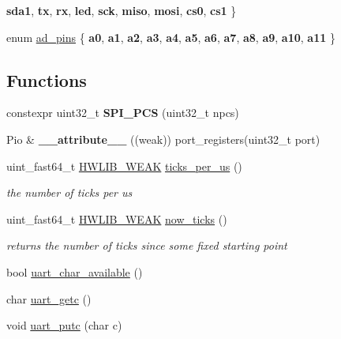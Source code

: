 \begin{DoxyCompactItemize}
{\bfseries sda1}, 
{\bfseries tx}, 
{\bfseries rx}, 
\newline
{\bfseries led}, 
{\bfseries sck}, 
{\bfseries miso}, 
{\bfseries mosi}, 
\newline
{\bfseries cs0}, 
{\bfseries cs1}
 \}
\item 
enum \hyperlink{namespacedue_a5ecc98d40585c91eabbfb14f71bd7d4c}{ad\+\_\+pins} \{ \newline
{\bfseries a0}, 
{\bfseries a1}, 
{\bfseries a2}, 
{\bfseries a3}, 
\newline
{\bfseries a4}, 
{\bfseries a5}, 
{\bfseries a6}, 
{\bfseries a7}, 
\newline
{\bfseries a8}, 
{\bfseries a9}, 
{\bfseries a10}, 
{\bfseries a11}
 \}
\end{DoxyCompactItemize}
\subsection*{Functions}
\begin{DoxyCompactItemize}
\item 
\mbox{\label{namespacedue_af52720fcb38ebf98b8dcf75b1bfc8188}} 
constexpr uint32\+\_\+t {\bfseries S\+P\+I\+\_\+\+P\+CS} (uint32\+\_\+t npcs)
\item 
\mbox{\label{namespacedue_a13c9d311278ec150daa2a17a0f0c2fd2}} 
Pio \& {\bfseries \+\_\+\+\_\+attribute\+\_\+\+\_\+} ((weak)) port\+\_\+registers(uint32\+\_\+t port)
\item 
uint\+\_\+fast64\+\_\+t \hyperlink{hwlib-defines_8hpp_a04be4340016df60d6636c1d1c6d94fc9}{H\+W\+L\+I\+B\+\_\+\+W\+E\+AK} \hyperlink{namespacedue_aa7b4a4a4dffe3296d13e465cc3d78a62}{ticks\+\_\+per\+\_\+us} ()
\begin{DoxyCompactList}\small\item\em the number of ticks per us \end{DoxyCompactList}\item 
uint\+\_\+fast64\+\_\+t \hyperlink{hwlib-defines_8hpp_a04be4340016df60d6636c1d1c6d94fc9}{H\+W\+L\+I\+B\+\_\+\+W\+E\+AK} \hyperlink{namespacedue_a686106c53be24f799ee7313069a678be}{now\+\_\+ticks} ()
\begin{DoxyCompactList}\small\item\em returns the number of ticks since some fixed starting point \end{DoxyCompactList}\item 
bool \hyperlink{namespacedue_a3fb7cef33e032624d26b3a94f09974d1}{uart\+\_\+char\+\_\+available} ()
\item 
char \hyperlink{namespacedue_aaac909e6a73b4a5ed65230aad135c277}{uart\+\_\+getc} ()
\item 
void \hyperlink{namespacedue_a4a5e5e08f37cad92092942e5b8898471}{uart\+\_\+putc} (char c)
\end{DoxyCompactItemize}


